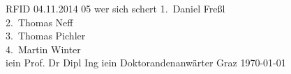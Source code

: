 \TUHeader                          %
{RFID}                       %
{04.11.2014}                        %
{05}                            %
{wer sich schert}      %
{
1.~Daniel Freßl\\
2.~Thomas Neff\\                    
3.~Thomas Pichler \\ 
4.~Martin Winter \\                  %
}
{iein Prof. Dr Dipl Ing}
{iein Doktorandenanwärter}                          %
{Graz}                              %
{\today}                            %




\pagebreak
  
\tableofcontents
  
\pagebreak